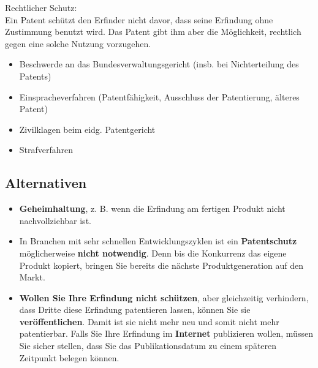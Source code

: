 Rechtlicher Schutz:\\
Ein Patent schützt den Erfinder nicht davor, dass seine Erfindung ohne
Zustimmung benutzt wird. Das Patent gibt ihm aber die Möglichkeit, rechtlich
gegen eine solche Nutzung vorzugehen.
\begin{itemize}
	\item Beschwerde an das Bundesverwaltungsgericht (insb. bei
	Nichterteilung des Patents)
	\item Einspracheverfahren (Patentfähigkeit, Ausschluss der Patentierung,
	älteres Patent)
	\item Zivilklagen beim eidg. Patentgericht
	\item Strafverfahren
\end{itemize}

\subsection{Alternativen}
\begin{itemize}
	\tightlist
	\item \textbf{Geheimhaltung}, z. B. wenn die Erfindung am fertigen Produkt
	nicht nachvollziehbar ist.
	\item In Branchen mit sehr schnellen Entwicklungszyklen ist ein
	\textbf{Patentschutz} möglicherweise \textbf{nicht notwendig}.
	Denn bis die Konkurrenz das eigene Produkt kopiert, bringen Sie bereits die
	nächste Produktgeneration auf den Markt.
	\item \textbf{Wollen Sie Ihre Erfindung nicht schützen},
	aber gleichzeitig verhindern, dass Dritte diese Erfindung patentieren
	lassen, können Sie sie \textbf{veröffentlichen}.
	Damit ist sie nicht mehr neu und somit nicht mehr patentierbar.
	Falls Sie Ihre Erfindung im \textbf{Internet} publizieren wollen,
	müssen Sie sicher stellen, dass Sie das Publikationsdatum zu einem späteren
	Zeitpunkt belegen können.
\end{itemize}

